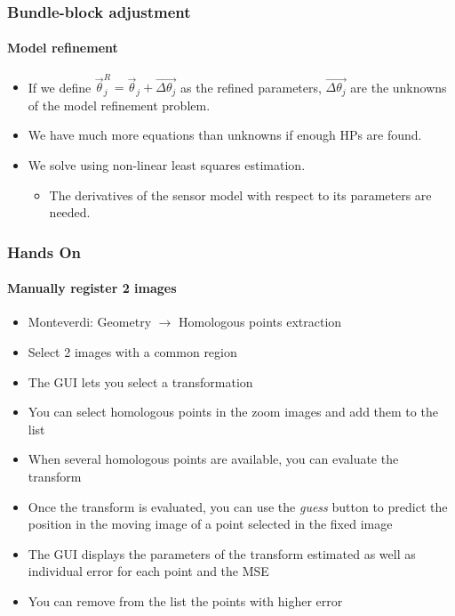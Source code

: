 \documentclass[compress]{beamer}
\begin{document}
\begin{frame}
  \frametitle{Bundle-block adjustment}
  \framesubtitle{Model refinement}
  \begin{itemize}
    \item If we define $\vec\theta_j^R = \vec\theta_j +
    \vec{\Delta\theta_j}$ as the refined parameters,
    $\vec{\Delta\theta_j}$ are the unknowns of the model refinement
    problem.
    \item We have much more equations than unknowns if enough HPs are
    found.
    \item We solve using non-linear least squares estimation.
      \begin{itemize}
	\item The derivatives of the sensor model with respect to its
	parameters are needed.
      \end{itemize}
  \end{itemize}
  
\end{frame}

\begin{frame}
  \frametitle{Hands On}
  \framesubtitle{Manually register 2 images}
\vspace*{-0.6cm}
\small
  \begin{itemize}
  \item Monteverdi: Geometry $\rightarrow$ Homologous points extraction
  \item Select 2 images with a common region
  \item The GUI lets you select a transformation
  \item You can select homologous points in the zoom images and add
    them to the list
  \item When several homologous points are available, you can evaluate
    the transform
  \item Once the transform is evaluated, you can use the {\em guess}
    button to predict the position in the moving image of a point
    selected in the fixed image
  \item The GUI displays the parameters of the transform estimated as
    well as individual error for each point and the MSE
  \item You can remove from the list the points with higher error
  \end{itemize}
\end{frame}
\end{document}
